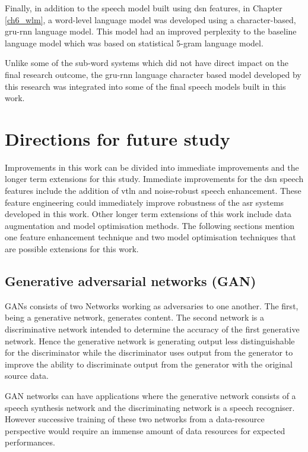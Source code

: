 Finally, in addition to the speech model built using \acrshort{dsn} features, in Chapter \ref{ch6_wlm}, a word-level language model was developed using a character-based, \acrshort{gru}-\acrshort{rnn} language model.  This model had an improved perplexity to the baseline language model which was based on statistical 5-gram language model.

Unlike some of the sub-word systems which did not have direct impact on the final research outcome, the \acrshort{gru}-\acrshort{rnn} language character based model developed by this research was integrated into some of the final speech models built in this work.
\stopblue

\section{Directions for future study}
Improvements in this work can be divided into immediate improvements and the longer term extensions for this study.  Immediate improvements for the \acrshort{dsn} speech features include the addition of \acrfull{vtln} and noise-robust speech enhancement.  These feature engineering could immediately improve robustness of the \acrshort{asr} systems developed in this work. Other longer term extensions of this work include data augmentation and model optimisation methods. The following sections mention one feature enhancement technique and two model optimisation techniques that are possible extensions for this work. 

\subsection{Generative adversarial networks (GAN)}

GANs consists of two Networks working as adversaries to one another.  The first, being a generative network, generates content.  The second network is a discriminative network intended to determine the accuracy of the first generative network.  Hence the generative network is generating output less distinguishable for the discriminator while the discriminator uses output from the generator to improve the ability to discriminate output from the generator with the original source data.

GAN networks can have applications where the generative network consists of a speech synthesis network and the discriminating network is  a speech recogniser.  However successive training of these two networks from a data-resource perspective would require an immense amount of data resources for expected performances. 

